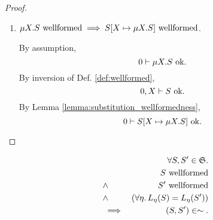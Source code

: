 \documentclass{llncs}
\newcommand*{\Sy}{\mathfrak{S}}
\newcommand*{\sequiv}{\sim}
\newcommand*{\wf}[1]{\text{$#1$ {\normalfont \rmfamily wellformed}}}
\newcommand*{\envimpl}       [2]{#1 \vdash #2}
\newcommand*{\envimplok}     [2]{\envimpl{#1}{\text{$#2$ {\normalfont \rmfamily ok}}}}
\renewcommand*{\|}{\;|\;}
\begin{document}
\begin{proof}
\begin{enumerate}
    \item
      \label{case:inversion_wellformedness:mu}
      $\wf{\mu X.S} \implies \wf{S[X \mapsto \mu X.S]}$.

      By assumption,
      \begin{equation*}
        \envimplok{0}{\mu X.S}.
      \end{equation*}
      By inversion of Def. \ref{def:wellformed},
      \begin{equation*}
        \envimplok{0, X}{S}.
      \end{equation*}
      By Lemma \ref{lemma:substitution_wellformedness},
      \begin{equation*}
        \envimplok{0}{S[X \mapsto \mu X.S]}.
      \end{equation*}
  \end{enumerate}
\end{proof}

\begin{theorem}
  \label{th:equality_equivalence}
  \begin{eqnarray*}
    &&         \forall S, S' \in \Sy. \\
    &&         \wf{S} \\
    &\land&    \wf{S'} \\
    &\land&    (\forall \eta.\, L_\eta(S) = L_\eta(S')) \\
    &\implies& (S, S') \in \sequiv.
  \end{eqnarray*}
\end{theorem}
\end{document}
